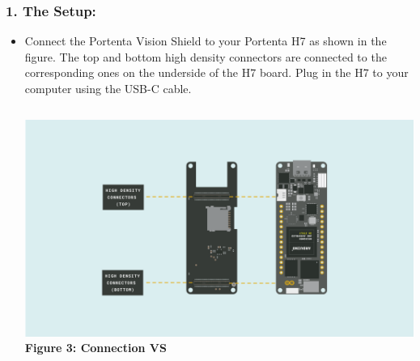 \documentclass[10pt, a4paper]{beamer}
\begin{document}
	\begin{frame}
		\frametitle{1. The Setup:}
		
		\begin{itemize}
			\item {Connect the Portenta Vision Shield to your Portenta H7 as shown in the figure. The top and bottom high density connectors are connected to the corresponding ones on the underside of the H7 board. Plug in the H7 to your computer using the USB-C cable.}
			
				\begin{columns}
					\centering
					\includegraphics[width=\textwidth]{images/Connection VS.png}
					\vspace{0.2cm}
					\textbf{Figure 3: Connection VS}
				\end{columns}
				
		\end{itemize}
	\end{frame}
	
\end{document}
